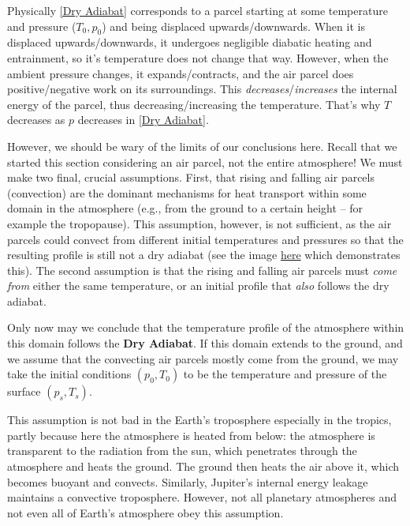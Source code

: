 Physically \ref{Dry Adiabat} corresponds to a parcel starting at some temperature and pressure (\(T_0,p_0\)) and being displaced upwards/downwards. When it is displaced upwards/downwards, it undergoes negligible diabatic heating and entrainment, so it's temperature does not change that way. However, when the ambient pressure changes, it expands/contracts, and the air parcel does positive/negative work on its surroundings. This \textit{decreases}/\textit{increases} the internal energy of the parcel, thus decreasing/increasing the temperature. That's why \(T\) decreases as \(p\) decreases in \ref{Dry Adiabat}. 

However, we should be wary of the limits of our conclusions here. Recall that we started this section considering an air parcel, not the entire atmosphere! We must make two final, crucial assumptions. First, that rising and falling air parcels (convection) are the dominant mechanisms for heat transport within some domain in the atmosphere (e.g., from the ground to a certain height -- for example the tropopause). This assumption, however, is not sufficient, as the air parcels could convect from different initial temperatures and pressures so that the resulting profile is still not a dry adiabat (see the image \href{https://en.wikipedia.org/wiki/Inversion_(meteorology)#/media/File:Absinkinversion.png}{here} which demonstrates this). The second assumption is that the rising and falling air parcels must \textit{come from} either the same temperature, or an initial profile that \textit{also} follows the dry adiabat.

Only now may we conclude that the temperature profile of the atmosphere within this domain follows the \textbf{Dry Adiabat}. If this domain extends to the ground, and we assume that the convecting air parcels mostly come from the ground, we may take the initial conditions \((p_0,T_0)\) to be the temperature and pressure of the surface \((p_s,T_s)\).

This assumption is not bad in the Earth's troposphere especially in the tropics, partly because here the atmosphere is heated from below: the atmosphere is transparent to the radiation from the sun, which penetrates through the atmosphere and heats the ground. The ground then heats the air above it, which becomes buoyant and convects. Similarly, Jupiter's internal energy leakage maintains a convective troposphere. However, not all planetary atmospheres and not even all of Earth's atmosphere obey this assumption.

